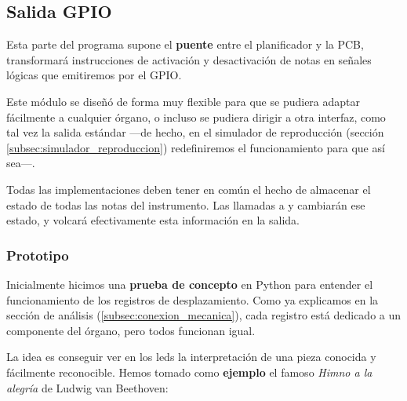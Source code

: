 \subsection{Salida GPIO}

Esta parte del programa supone el \textbf{puente} entre el planificador y la \acrshort{PCB}, transformará instrucciones de activación y desactivación de notas en señales lógicas que emitiremos por el \acrshort{GPIO}. 

Este módulo se diseñó de forma muy flexible para que se pudiera adaptar fácilmente a cualquier órgano, o incluso se pudiera dirigir a otra interfaz, como tal vez la salida estándar ---de hecho, en el simulador de reproducción (sección \ref{subsec:simulador_reproduccion}) redefiniremos el funcionamiento para que así sea---.

Todas las implementaciones deben tener en común el hecho de almacenar el estado de todas las notas del instrumento. Las llamadas a  y  cambiarán ese estado, y  volcará efectivamente esta información en la salida.

\subsubsection{Prototipo}

Inicialmente hicimos una \textbf{prueba de concepto} en Python para entender el funcionamiento de los registros de desplazamiento. Como ya explicamos en la sección de análisis (\ref{subsec:conexion_mecanica}), cada registro está dedicado a un componente del órgano, pero todos funcionan igual.

La idea es conseguir ver en los \acrshort{led}s la interpretación de una pieza conocida y fácilmente reconocible. Hemos tomado como \textbf{ejemplo} el famoso \textit{Himno a la alegría} de Ludwig van Beethoven:

\smallskip

